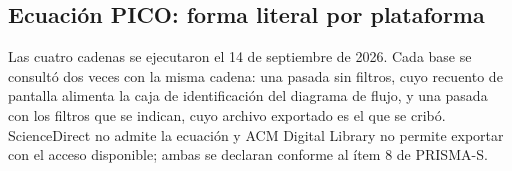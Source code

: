 \documentclass[pdflatex,sn-mathphys-num]{sn-jnl}
\theoremstyle{thmstyleone}
\theoremstyle{thmstyletwo}
\theoremstyle{thmstylethree}
\begin{document}
\begin{appendices}

\section{Ecuación PICO: forma literal por plataforma}\label{app:cadenas}

Las cuatro cadenas se ejecutaron el 14 de septiembre de 2026. Cada base se consultó dos veces con la misma cadena: una pasada sin filtros, cuyo recuento de pantalla alimenta la caja de identificación del diagrama de flujo, y una pasada con los filtros que se indican, cuyo archivo exportado es el que se cribó. ScienceDirect no admite la ecuación y ACM Digital Library no permite exportar con el acceso disponible; ambas se declaran conforme al ítem 8 de PRISMA-S.


\end{appendices}
\end{document}
